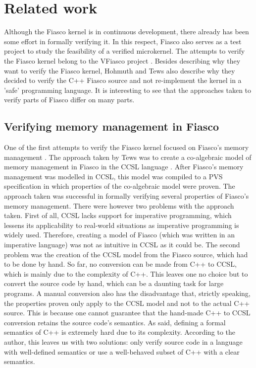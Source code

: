 \hypertarget{related_work}{\section{Related work}}
Although the Fiasco kernel is in continuous development, there already has been some effort in formally verifying it. In this respect, Fiasco also serves as a test project to study the feasibility of a verified microkernel. The attempts to verify the Fiasco kernel belong to the VFiasco project \cite{hohmuth03applying}. Besides describing why they want to verify the Fiasco kernel, Hohmuth and Tews also describe why they decided to verify the C++ Fiasco source and not re-implement the kernel in a 'safe' programming language. It is interesting to see that the approaches taken to verify parts of Fiasco differ on many parts.

\subsection{Verifying memory management in Fiasco}
One of the first attempts to verify the Fiasco kernel focused on Fiasco's memory management \cite{tews00case}. The approach taken by Tews was to create a co-algebraic model of memory management in Fiasco in the CCSL language \cite{hensel98reasoning}. After Fiasco's memory management was modelled in CCSL, this model was compiled to a PVS specification in which properties of the co-algebraic model were proven. The approach taken was successful in formally verifying several properties of Fiasco's memory management. There were however two problems with the approach taken. First of all, CCSL lacks support for imperative programming, which lessens its applicability to real-world situations as imperative programming is widely used. Therefore, creating a model of Fiasco (which was written in an imperative language) was not as intuitive in CCSL as it could be. The second problem was the creation of the CCSL model from the Fiasco source, which had to be done by hand. So far, no conversion can be made from C++ to CCSL, which is mainly due to the complexity of C++. This leaves one no choice but to convert the source code by hand, which can be a daunting task for large programs. A manual conversion also has the disadvantage that, strictly speaking, the properties proven only apply to the CCSL model and not to the actual C++ source. This is because one cannot guarantee that the hand-made C++ to CCSL conversion retains the source code's semantics. As said, defining a formal semantics of C++ is extremely hard due to its complexity. According to the author, this leaves us with two solutions: only verify source code in a language with well-defined semantics or use a well-behaved subset of C++ with a clear semantics.

